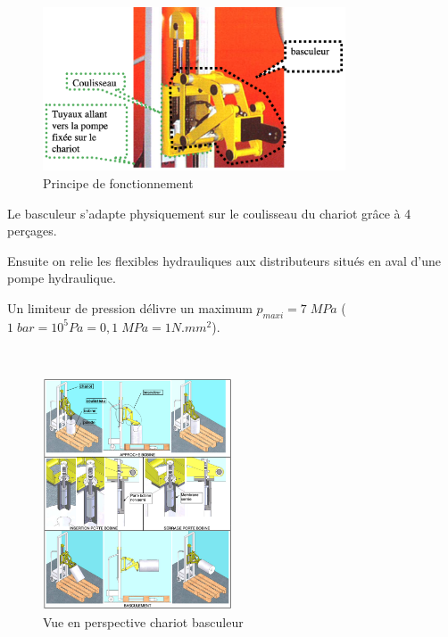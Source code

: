 \newpage

\begin{figure}[ht]
  \begin{center}
    \includegraphics[width=0.8\textwidth]{img/fig02}
  \end{center}
  \caption{Principe de fonctionnement}
\label{fig02}
\end{figure}

Le basculeur s'adapte physiquement sur le coulisseau du chariot grâce à 4 perçages.

Ensuite on relie les flexibles hydrauliques aux distributeurs situés en aval d'une pompe hydraulique.

Un limiteur de pression délivre un maximum $p_{maxi}=7\;MPa$
($1\;bar=10^5Pa=0,1\;MPa=1N.mm^2$).

~\

\begin{figure}
	\vspace{-1cm}
  \begin{center}
    \includegraphics[width=0.5\textwidth]{img/fig03}
  \end{center}
\caption{Vue en perspective chariot basculeur}
\label{fig03}
\end{figure}

